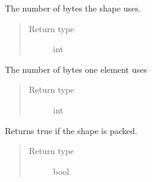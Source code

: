 \documentclass[letterpaper,10pt,english]{sphinxmanual}
\begin{document}

\begin{fulllineitems}
\label{\detokenize{reference/py:migraphx.bytes}}
\sphinxAtStartPar
The number of bytes the shape uses.
\begin{quote}\begin{description}
\item[{Return type}] \leavevmode
\sphinxAtStartPar
int

\end{description}\end{quote}

\end{fulllineitems}


\begin{fulllineitems}
\label{\detokenize{reference/py:migraphx.type_size}}
\sphinxAtStartPar
The number of bytes one element uses
\begin{quote}\begin{description}
\item[{Return type}] \leavevmode
\sphinxAtStartPar
int

\end{description}\end{quote}

\end{fulllineitems}


\begin{fulllineitems}
\label{\detokenize{reference/py:migraphx.packed}}
\sphinxAtStartPar
Returns true if the shape is packed.
\begin{quote}\begin{description}
\item[{Return type}] \leavevmode
\sphinxAtStartPar
bool

\end{description}\end{quote}

\end{fulllineitems}
\end{document}
